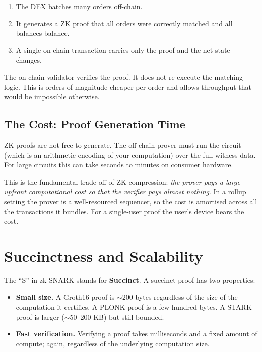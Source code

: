 \begin{enumerate}
  \item The DEX batches many orders off-chain.
  \item It generates a ZK proof that all orders were correctly matched and all balances balance.
  \item A single on-chain transaction carries only the proof and the net state changes.
\end{enumerate}

The on-chain validator verifies the proof. It does not re-execute the matching logic. This is orders of magnitude cheaper per order and allows throughput that would be impossible otherwise.

\subsection*{The Cost: Proof Generation Time}

ZK proofs are not free to generate. The off-chain prover must run the circuit (which is an arithmetic encoding of your computation) over the full witness data. For large circuits this can take seconds to minutes on consumer hardware.

This is the fundamental trade-off of ZK compression: \emph{the prover pays a large upfront computational cost so that the verifier pays almost nothing}. In a rollup setting the prover is a well-resourced sequencer, so the cost is amortised across all the transactions it bundles. For a single-user proof the user's device bears the cost.

\section{Succinctness and Scalability} \label{sec:succinctness}

The ``S'' in zk-SNARK stands for \textbf{Succinct}. A succinct proof has two properties:

\begin{itemize}
  \item \textbf{Small size.} A Groth16 proof is $\sim$200 bytes regardless of the size of the computation it certifies. A PLONK proof is a few hundred bytes. A STARK proof is larger ($\sim$50--200 KB) but still bounded.
  \item \textbf{Fast verification.} Verifying a proof takes milliseconds and a fixed amount of compute; again, regardless of the underlying computation size.
\end{itemize}

